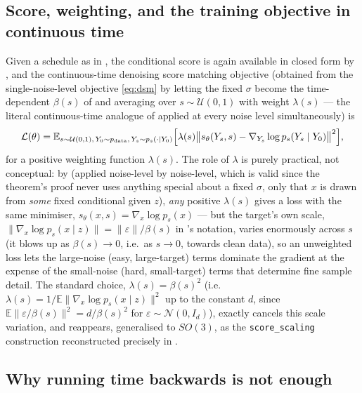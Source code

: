 \documentclass[11pt,a4paper]{report}
\theoremstyle{definition}
\theoremstyle{remark}
\newcommand{\EE}{\mathbb E}
\newcommand{\pyfunc}[1]{\texttt{#1}}
\begin{document}
\subsection{Score, weighting, and the training objective in continuous time}

Given a schedule as in , the conditional score
is again available in closed form by , and the
continuous-time denoising score matching objective
(obtained from the single-noise-level objective \eqref{eq:dsm} by letting
the fixed $\sigma$ become the time-dependent $\beta(s)$ of
 and averaging over $s\sim\mathcal U(0,1)$ with
weight $\lambda(s)$ --- the literal continuous-time analogue of
 applied at every noise level simultaneously) is
\begin{equation}
\label{eq:dsm-continuous}
\mathcal L(\theta) = \EE_{s\sim\mathcal U(0,1),\,Y_0\sim p_{\mathrm{data}},\,Y_s\sim p_s(\cdot\mid Y_0)}
\Bigl[\lambda(s)\bigl\|s_\theta(Y_s,s) - \nabla_{Y_s}\log p_s(Y_s\mid Y_0)\bigr\|^2\Bigr] ,
\end{equation}
for a positive weighting function $\lambda(s)$. The role of $\lambda$ is
purely practical, not conceptual: by  (applied
noise-level by noise-level, which is valid since the theorem's proof never
uses anything special about a fixed $\sigma$, only that $x$ is drawn from
\emph{some} fixed conditional given $z$), \emph{any} positive $\lambda(s)$
gives a loss with the same minimiser, $s_\theta(x,s)=\nabla_x\log p_s(x)$
--- but the target's own scale, $\|\nabla_x\log p_s(x\mid z)\|=\|\varepsilon\|/\beta(s)$
in 's notation, varies enormously across $s$
(it blows up as $\beta(s)\to0$, i.e.\ as $s\to0$, towards clean data), so an
unweighted loss lets the large-noise (easy, large-target) terms dominate
the gradient at the expense of the small-noise (hard, small-target) terms
that determine fine sample detail. The standard choice,
$\lambda(s)=\beta(s)^2$ (i.e.\ $\lambda(s)=1/\EE\|\nabla_x\log p_s(x\mid z)\|^2$
up to the constant $d$, since $\EE\|\varepsilon/\beta(s)\|^2=d/\beta(s)^2$
for $\varepsilon\sim\mathcal N(0,I_d)$), exactly cancels this scale
variation, and reappears, generalised to $SO(3)$, as the
\pyfunc{score\_scaling} construction reconstructed precisely in
.

\subsection{Why running time backwards is not enough}
\label{sec:why-score-appears}
\end{document}
